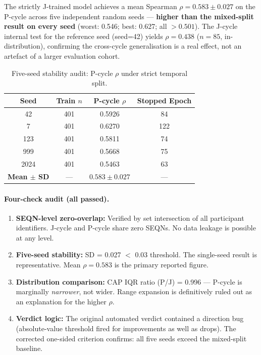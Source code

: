 \documentclass[12pt,a4paper,oneside]{report}
\begin{document}
The strictly J-trained model achieves a mean Spearman $\rho = 0.583 \pm 0.027$ on the P-cycle across five independent random seeds --- \textbf{higher than the mixed-split result on every seed} (worst: 0.546; best: 0.627; all $> 0.501$). The J-cycle internal test for the reference seed (seed=42) yields $\rho = 0.438$ ($n = 85$, in-distribution), confirming the cross-cycle generalisation is a real effect, not an artefact of a larger evaluation cohort.

\begin{table}[H]
\centering
\caption{Five-seed stability audit: P-cycle $\rho$ under strict temporal split.}
\label{tab:seed_stability}
\begin{tabular}{@{}cccc@{}}
\toprule
\textbf{Seed} & \textbf{Train $n$} & \textbf{P-cycle $\rho$} & \textbf{Stopped Epoch} \\ \midrule
42   & 401 & 0.5926 & 84  \\
7    & 401 & 0.6270 & 122 \\
123  & 401 & 0.5811 & 74  \\
999  & 401 & 0.5668 & 75  \\
2024 & 401 & 0.5463 & 63  \\ \midrule
\textbf{Mean $\pm$ SD} & --- & $\mathbf{0.583 \pm 0.027}$ & --- \\ \bottomrule
\end{tabular}
\end{table}

\paragraph{Four-check audit (all passed).}
\begin{enumerate}[leftmargin=*]
    \item \textbf{SEQN-level zero-overlap:} Verified by set intersection of all participant identifiers. J-cycle and P-cycle share zero SEQNs. No data leakage is possible at any level.
    \item \textbf{Five-seed stability:} SD = 0.027 $<$ 0.03 threshold. The single-seed result is representative. Mean $\rho = 0.583$ is the primary reported figure.
    \item \textbf{Distribution comparison:} CAP IQR ratio (P/J) = 0.996 --- P-cycle is marginally \emph{narrower}, not wider. Range expansion is definitively ruled out as an explanation for the higher $\rho$.
    \item \textbf{Verdict logic:} The original automated verdict contained a direction bug (absolute-value threshold fired for improvements as well as drops). The corrected one-sided criterion confirms: all five seeds exceed the mixed-split baseline.
\end{enumerate}
\end{document}
